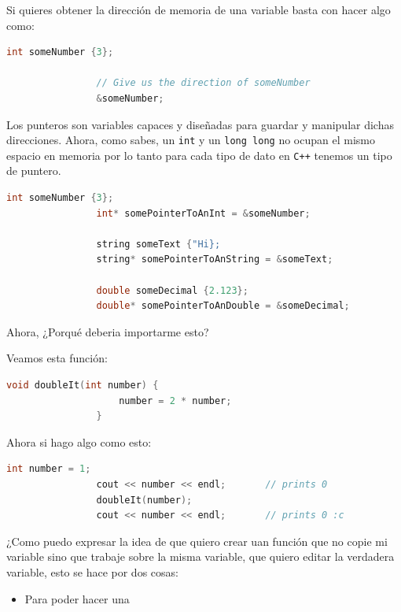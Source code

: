 \documentclass[12pt, fleqn]{report}                             %
\theoremstyle{break}                                            %
\newcommand{\textCode}[1]  { \texttt{#1} }                      %
\newcommand \Cpp  {\textCode{C++} }                               %
\begin{document}
            Si quieres obtener la dirección de memoria de una variable basta con hacer algo como:
            \begin{lstlisting}[language=C++, gobble=16]
                int someNumber {3};

                // Give us the direction of someNumber
                &someNumber;
            \end{lstlisting}

            Los punteros son variables capaces y diseñadas para guardar y manipular dichas direcciones.
            Ahora, como sabes, un \textCode{int} y un \textCode{long long} no ocupan el mismo espacio en memoria
            por lo tanto para cada tipo de dato en \Cpp tenemos un tipo de puntero.
            \begin{lstlisting}[language=C++, gobble=16]
                int someNumber {3};
                int* somePointerToAnInt = &someNumber;

                string someText {"Hi};
                string* somePointerToAnString = &someText;

                double someDecimal {2.123};
                double* somePointerToAnDouble = &someDecimal;
            \end{lstlisting}

            Ahora, ¿Porqué deberia importarme esto?

            Veamos esta función:
            \begin{lstlisting}[language=C++, gobble=16]
                void doubleIt(int number) {
                    number = 2 * number;
                }
            \end{lstlisting}

            Ahora si hago algo como esto:
            \begin{lstlisting}[language=C++, gobble=16]
                int number = 1;
                cout << number << endl;       // prints 0
                doubleIt(number);
                cout << number << endl;       // prints 0 :c
            \end{lstlisting}

            ¿Como puedo expresar la idea de que quiero crear uan función que no copie mi variable sino
            que trabaje sobre la misma variable, que quiero editar la verdadera variable, esto se
            hace por dos cosas:
            \begin{itemize}
                \item Para poder hacer una 
            \end{itemize}
\end{document}
